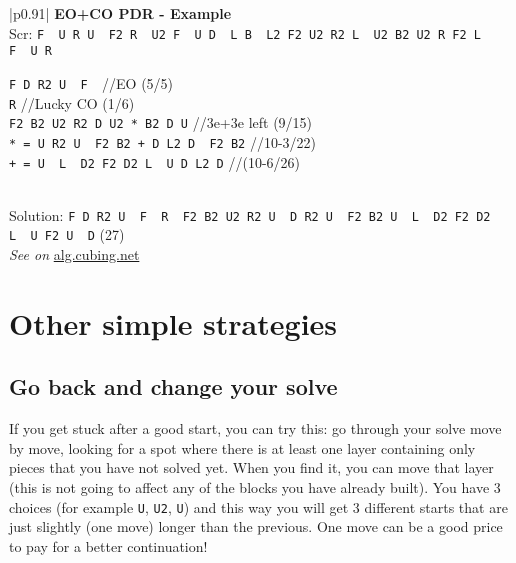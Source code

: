 \documentclass[11pt,a4paper]{book}
\newcommand{\p}{\textquotesingle}
\newcommand{\m}{\texttt}
\newcommand{\ps}{\p\,\,}
\newcommand{\comment}[1]{{\color{gray}\quad//#1}}
\begin{document}
\bigskip
\begin{tabular}{|p{}|}
\hline
\textbf{EO+CO PDR - Example}\\
\hline
Scr: \m{F\ps U R U\ps F2 R\ps U2 F\ps U D\ps L B\ps L2 F2 U2 R2 L\ps U2 B2 U2 R F2 L\ps F\ps U R}\\
\hline
\begin{minipage}[l]{0.650\textwidth}
\m{F D R2 U\ps F\ps}\comment{EO (5/5)}\\
\m{R\p} \comment{Lucky CO (1/6)}\\
\m{F2 B2 U2 R2 D U2 * B2 D U\p} \comment{3e+3e left (9/15)}\\
\m{* = U R2 U\ps F2 B2 + D L2 D\ps F2 B2} \comment{10-3/22)}\\
\m{+ = U\ps L\ps D2 F2 D2 L\ps U D L2 D\p} \comment{(10-6/26)}
\end{minipage}
\begin{minipage}[c]{0.25\textwidth}

\end{minipage}\\
\hline
Solution: \m{F D R2 U\ps F\ps R\ps F2 B2 U2 R2 U\ps D R2 U\ps F2 B2 U\ps L\ps D2 F2 D2 L\ps U F2 U\ps D} (27)\\
\hline
\emph{See on }\href{https://alg.cubing.net/?setup=F-_U_R_U-_F2_R-_U2_F-_U_D-_L_B-_L2_F2_U2_R2_L-_U2_B2_U2_R_F2_L-_F-_U_R_&alg=F_D_R2_U-_F-_\%2F\%2FEO_(5\%2F5)\%0AR-_\%2F\%2FLucky_CO_(1\%2F6)\%0AF2_B2_U2_R2_D_U2_B2_D_U-_\%2F\%2F3e_\%26\%232b\%3B_3e_left}{alg.cubing.net}\\
\hline
\end{tabular}
\bigskip


\section{Other simple strategies}
\subsection{Go back and change your solve}
\label{goback}
If you get stuck after a good start, you can try this: go through your solve move by move, looking for a spot where there is at least one layer containing only pieces that you have not solved yet. When you find it, you can move that layer (this is not going to affect any of the blocks you have already built). You have 3 choices (for example \m U, \m{U2}, \m{U\p}) and this way you will get 3 different starts that are just slightly (one move) longer than the previous. One move can be a good price to pay for a better continuation!
\end{document}

